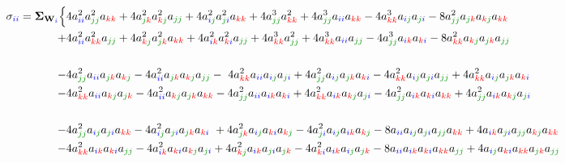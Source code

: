 \documentclass{article}
\begin{document}
\begin{equation}
\begin{aligned}
 \sigma_{\idx{i}{i}} = \mathbf{\Sigma}_{\textbf{W}_{\cidx{i}}} \Bigl\{& 4 a_{\idx{i}{i}}^{2} a_{\idx{j}{j}}^{2} a_{\idx{k}{k}}  + 4  a_{\idx{j}{k}}^{2} a_{\idx{k}{j}}^{2} a_{\idx{j}{j}} + 4 a_{\idx{i}{j}}^{2} a_{\idx{j}{i}}^{2} a_{\idx{k}{k}}  + 4 a_{\idx{j}{j}}^{3} a_{\idx{k}{k}}^{2}+ 4 a_{\idx{j}{j}}^{3}  a_{\idx{i}{i}} a_{\idx{k}{k}} - 4 a_{\idx{k}{k}}^{3} a_{\idx{i}{j}} a_{\idx{j}{i}}  -  8 a_{\idx{j}{j}}^{2} a_{\idx{j}{k}} a_{\idx{k}{j}} a_{\idx{k}{k}}  \\
+ & 4 a_{\idx{i}{i}}^{2} a_{\idx{k}{k}}^{2} a_{\idx{j}{j}} + 4 a_{\idx{k}{j}}^{2} a_{\idx{j}{k}}^{2}  a_{\idx{k}{k}}+ 4 a_{\idx{i}{k}}^{2} a_{\idx{k}{i}}^{2}  a_{\idx{j}{j}} + 4 a_{\idx{k}{k}}^{3} a_{\idx{j}{j}}^{2}  + 4 a_{\idx{k}{k}}^{3} a_{\idx{i}{i}} a_{\idx{j}{j}}  - 4 a_{\idx{j}{j}}^{3} a_{\idx{i}{k}}  a_{\idx{k}{i}} -  8 a_{\idx{k}{k}}^{2} a_{\idx{k}{j}} a_{\idx{j}{k}} a_{\idx{j}{j}} \\
\\
- & 4 a_{\idx{j}{j}}^{2} a_{\idx{i}{i}} a_{\idx{j}{k}} a_{\idx{k}{j}} - 4 a_{\idx{i}{i}}^{2} a_{\idx{j}{k}} a_{\idx{k}{j}} a_{\idx{j}{j}} - \ 4 a_{\idx{k}{k}}^{2} a_{\idx{i}{i}} a_{\idx{i}{j}} a_{\idx{j}{i}}  +  4 a_{\idx{j}{j}}^{2} a_{\idx{i}{j}}  a_{\idx{j}{k}} a_{\idx{k}{i}} - 4 a_{\idx{k}{k}}^{2} a_{\idx{i}{j}} a_{\idx{j}{i}} a_{\idx{j}{j}}  +  4 a_{\idx{k}{k}}^{2} a_{\idx{i}{j}} a_{\idx{j}{k}} a_{\idx{k}{i}} \\
- & 4 a_{\idx{k}{k}}^{2} a_{\idx{i}{i}} a_{\idx{k}{j}} a_{\idx{j}{k}} - 4 a_{\idx{i}{i}}^{2} a_{\idx{k}{j}} a_{\idx{j}{k}} a_{\idx{k}{k}} - 4 a_{\idx{j}{j}}^{2} a_{\idx{i}{i}} a_{\idx{i}{k}}  a_{\idx{k}{i}}  + 4 a_{\idx{k}{k}}^{2} a_{\idx{i}{k}} a_{\idx{k}{j}}  a_{\idx{j}{i}}  - 4 a_{\idx{j}{j}}^{2} a_{\idx{i}{k}}  a_{\idx{k}{i}} a_{\idx{k}{k}} + 4 a_{\idx{j}{j}}^{2} a_{\idx{i}{k}} a_{\idx{k}{j}} a_{\idx{j}{i}} \\
\\
- & 4 a_{\idx{j}{j}}^{2}  a_{\idx{i}{j}} a_{\idx{j}{i}} a_{\idx{k}{k}} - 4 a_{\idx{i}{j}}^{2} a_{\idx{j}{i}} a_{\idx{j}{k}} a_{\idx{k}{i}} \ + 4 a_{\idx{j}{k}}^{2}  a_{\idx{i}{j}} a_{\idx{k}{i}} a_{\idx{k}{j}} - 4 a_{\idx{j}{i}}^{2} a_{\idx{i}{j}} a_{\idx{i}{k}} a_{\idx{k}{j}} - 8 a_{\idx{i}{i}} a_{\idx{i}{j}} a_{\idx{j}{i}} a_{\idx{j}{j}} a_{\idx{k}{k}} + 4 a_{\idx{i}{k}} a_{\idx{j}{i}} a_{\idx{j}{j}} a_{\idx{k}{j}} a_{\idx{k}{k}}\\
- & 4 a_{\idx{k}{k}}^{2}  a_{\idx{i}{k}} a_{\idx{k}{i}} a_{\idx{j}{j}}   - 4 a_{\idx{i}{k}}^{2} a_{\idx{k}{i}} a_{\idx{k}{j}} a_{\idx{j}{i}} + 4 a_{\idx{k}{j}}^{2} a_{\idx{i}{k}} a_{\idx{j}{i}} a_{\idx{j}{k}}  - 4 a_{\idx{k}{i}}^{2} a_{\idx{i}{k}} a_{\idx{i}{j}} a_{\idx{j}{k}}   - 8 a_{\idx{i}{i}} a_{\idx{i}{k}} a_{\idx{k}{i}}  a_{\idx{k}{k}}  a_{\idx{j}{j}} + 4 a_{\idx{i}{j}} a_{\idx{k}{i}} a_{\idx{k}{k}} a_{\idx{j}{k}} a_{\idx{j}{j}} \\

\end{aligned}
\end{equation}
\end{document}
